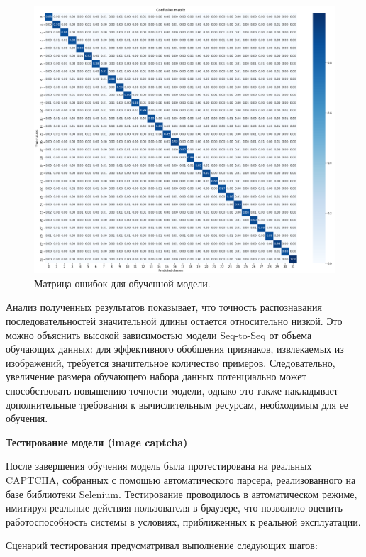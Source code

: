 \begin{figure}[H]
    \centering
    \includegraphics[width=1\linewidth]{imgs/textcaptcha/Confusion_matrix.png}
    \caption{Матрица ошибок для обученной модели.}
    \label{fig:cm}
\end{figure}

Анализ полученных результатов показывает, что точность распознавания 
последовательностей значительной длины остается относительно низкой. Это можно 
объяснить высокой зависимостью модели Seq-to-Seq от объема обучающих данных: для 
эффективного обобщения признаков, извлекаемых из изображений, требуется 
значительное количество примеров. Следовательно, увеличение размера обучающего 
набора данных потенциально может способствовать повышению точности модели, 
однако это также накладывает дополнительные требования к вычислительным ресурсам, 
необходимым для ее обучения.

\textbf{Тестирование модели (image captcha)}

После завершения обучения модель была протестирована на реальных CAPTCHA, 
собранных с помощью автоматического парсера, реализованного на базе библиотеки 
Selenium. Тестирование проводилось в автоматическом режиме, имитируя реальные 
действия пользователя в браузере, что позволило оценить работоспособность системы 
в условиях, приближенных к реальной эксплуатации.

Сценарий тестирования предусматривал выполнение следующих шагов:

